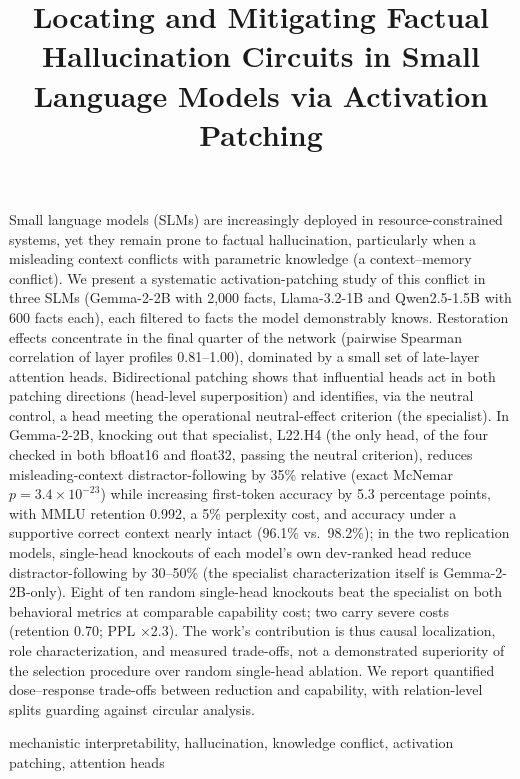 \documentclass[paper]{ieice}
\title[Locating and Mitigating Factual Hallucination Circuits in SLMs]{Locating and Mitigating Factual Hallucination Circuits in Small Language Models via Activation Patching}
\newcommand{\emodel}{Gemma-2-2B}
\begin{document}
\maketitle

\begin{summary}
Small language models (SLMs) are increasingly deployed in resource-constrained
systems, yet they remain prone to factual hallucination, particularly when a
misleading context conflicts with parametric knowledge (a context--memory
conflict). We present a systematic activation-patching study of this conflict in
three SLMs (\emodel{} with 2{,}000 facts, Llama-3.2-1B and
Qwen2.5-1.5B with 600 facts each), each filtered to facts the model demonstrably knows.
Restoration effects concentrate in the final quarter of the network
(pairwise Spearman correlation of layer profiles 0.81--1.00), dominated
by a small set of late-layer attention heads. Bidirectional patching shows that influential heads act in
both patching directions (head-level superposition) and identifies,
via the neutral control, a head meeting the operational neutral-effect
criterion (the specialist). In \emodel{}, knocking out that specialist, L22.H4
(the only head, of the four checked in both bfloat16 and float32,
passing the neutral criterion), reduces
misleading-context distractor-following by 35\% relative (exact McNemar
$p{=}3.4\times10^{-23}$) while
increasing first-token accuracy by 5.3 percentage points, with
MMLU retention 0.992, a 5\% perplexity cost, and accuracy under a
supportive correct context nearly intact (96.1\% vs.\ 98.2\%); in the two replication models, single-head knockouts of each
model's own dev-ranked head reduce distractor-following by 30--50\%
(the specialist characterization itself is \emodel{}-only). Eight of ten random single-head knockouts beat the
specialist on both behavioral metrics at comparable capability cost;
two carry severe costs (retention 0.70; PPL $\times$2.3). The work's
contribution is thus causal localization, role characterization, and
measured trade-offs, not a demonstrated superiority of the selection
procedure over random single-head ablation. We report
quantified dose--response
trade-offs between reduction and capability, with relation-level splits
guarding against circular analysis.
\end{summary}

\begin{keywords}
mechanistic interpretability, hallucination, knowledge conflict, activation patching, attention heads
\end{keywords}
\end{document}
